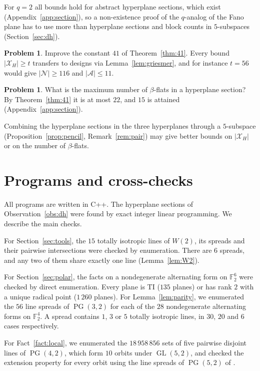 \documentclass[11pt]{amsart}
\theoremstyle{definition}
\newtheorem{problem}[theorem]{Problem}
\newcommand{\F}{\mathbb{F}}
\newcommand{\X}{\mathcal{X}}
\newcommand{\N}{\mathcal{N}}
\newcommand{\A}{\mathcal{A}}
\newcommand{\PG}{\operatorname{PG}}
\newcommand{\GL}{\operatorname{GL}}
\begin{document}
For $q=2$ all bounds hold for abstract hyperplane sections, which exist (Appendix~\ref{app:section}), so a non-existence proof of the $q$-analog of the Fano plane has to use more than hyperplane sections and block counts in $5$-subspaces (Section~\ref{sec:dh}).

\begin{problem}
Improve the constant $41$ of Theorem~\ref{thm:41}. Every bound $|\X_H|\ge t$ transfers to designs via Lemma~\ref{lem:griesmer}, and for instance $t=56$ would give $|\N|\ge116$ and $|\A|\le11$.
\end{problem}

\begin{problem}
What is the maximum number of $\beta$-flats in a hyperplane section? By Theorem~\ref{thm:41} it is at most $22$, and $15$ is attained (Appendix~\ref{app:section}).
\end{problem}

Combining the hyperplane sections in the three hyperplanes through a $5$-subspace (Proposition~\ref{prop:pencil}, Remark~\ref{rem:pair}) may give better bounds on $|\X_H|$ or on the number of $\beta$-flats.

\appendix
\section{Programs and cross-checks}\label{app:repro}
All programs are written in C++. The hyperplane sections of Observation~\ref{obs:dh} were found by exact integer linear programming. We describe the main checks.

For Section~\ref{sec:tools}, the $15$ totally isotropic lines of $W(2)$, its spreads and their pairwise intersections were checked by enumeration. There are $6$ spreads, and any two of them share exactly one line (Lemma~\ref{lem:W2}).

For Section~\ref{sec:polar}, the facts on a nondegenerate alternating form on $\F_2^6$ were checked by direct enumeration. Every plane is TI ($135$ planes) or has rank $2$ with a unique radical point ($1\,260$ planes). For Lemma~\ref{lem:parity}, we enumerated the $56$ line spreads of $\PG(3,2)$ for each of the $28$ nondegenerate alternating forms on $\F_2^4$. A spread contains $1$, $3$ or $5$ totally isotropic lines, in $30$, $20$ and $6$ cases respectively.

For Fact~\ref{fact:local}, we enumerated the $18\,958\,856$ sets of five pairwise disjoint lines of $\PG(4,2)$, which form $10$ orbits under $\GL(5,2)$, and checked the extension property for every orbit using the line spreads of $\PG(5,2)$ of \cite{MT09}.
\end{document}
